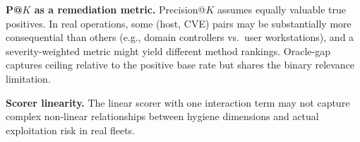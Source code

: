 \textbf{P@$K$ as a remediation metric.} Precision@$K$ assumes equally valuable true positives. In real operations, some (host, CVE) pairs may be substantially more consequential than others (e.g., domain controllers vs.\ user workstations), and a severity-weighted metric might yield different method rankings. Oracle-gap captures ceiling relative to the positive base rate but shares the binary relevance limitation.

\textbf{Scorer linearity.} The linear scorer with one interaction term may not capture complex non-linear relationships between hygiene dimensions and actual exploitation risk in real fleets.
